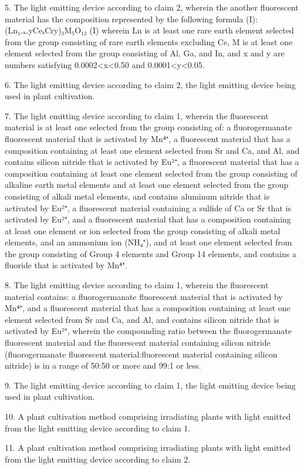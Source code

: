\documentclass[11pt,a4paper]{article}
\begin{document}
5. The light emitting device according to claim 2, wherein the another fluorescent material has the composition represented by the following formula (I): (Ln₁₋ₓ₋yCeₓCry)₃M₅O₁₂ (I) wherein Ln is at least one rare earth element selected from the group consisting of rare earth elements excluding Ce, M is at least one element selected from the group consisting of Al, Ga, and In, and x and y are numbers satisfying 0.0002<x<0.50 and 0.0001<y<0.05.

6. The light emitting device according to claim 2, the light emitting device being used in plant cultivation.

7. The light emitting device according to claim 1, wherein the fluorescent material is at least one selected from the group consisting of: a fluorogermanate fluorescent material that is activated by Mn⁴⁺, a fluorescent material that has a composition containing at least one element selected from Sr and Ca, and Al, and contains silicon nitride that is activated by Eu²⁺, a fluorescent material that has a composition containing at least one element selected from the group consisting of alkaline earth metal elements and at least one element selected from the group consisting of alkali metal elements, and contains aluminum nitride that is activated by Eu²⁺, a fluorescent material containing a sulfide of Ca or Sr that is activated by Eu²⁺, and a fluorescent material that has a composition containing at least one element or ion selected from the group consisting of alkali metal elements, and an ammonium ion (NH₄⁺), and at least one element selected from the group consisting of Group 4 elements and Group 14 elements, and contains a fluoride that is activated by Mn⁴⁺.

8. The light emitting device according to claim 1, wherein the fluorescent material contains: a fluorogermanate fluorescent material that is activated by Mn⁴⁺, and a fluorescent material that has a composition containing at least one element selected from Sr and Ca, and Al, and contains silicon nitride that is activated by Eu²⁺, wherein the compounding ratio between the fluorogermanate fluorescent material and the fluorescent material containing silicon nitride (fluorogermanate fluorescent material:fluorescent material containing silicon nitride) is in a range of 50:50 or more and 99:1 or less.

9. The light emitting device according to claim 1, the light emitting device being used in plant cultivation.

10. A plant cultivation method comprising irradiating plants with light emitted from the light emitting device according to claim 1.

11. A plant cultivation method comprising irradiating plants with light emitted from the light emitting device according to claim 2.
\end{document}
